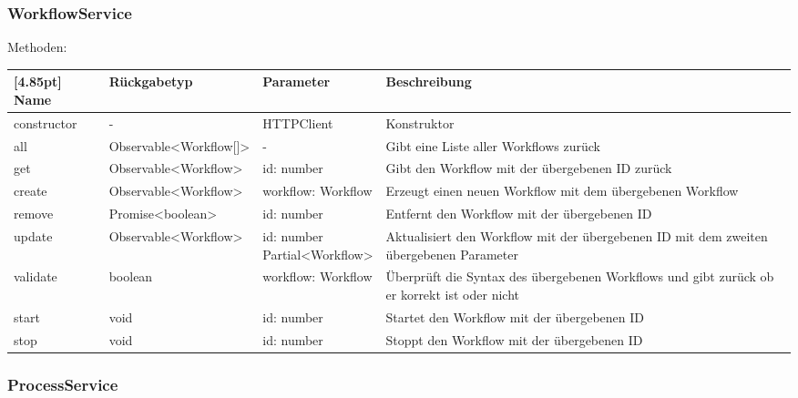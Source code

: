             \subsubsection{WorkflowService}
                
                Methoden:
        		\begin{center}
                \setlength\tabcolsep{5pt}
                	\renewcommand{\arraystretch}{1.5}
                    	\begin{tabularx}{\textwidth}{|l|l|l|X|}
                    	\hline
                    	\rowcolor[gray]{0.75}[4.85pt]
                		Name & Rückgabetyp & Parameter & Beschreibung \\ \hline 
                        constructor & - & HTTPClient & Konstruktor \\ \hline
                        all & Observable<Workflow[]> & - & Gibt eine Liste aller Workflows zurück\\ \hline
                        get & Observable<Workflow> & id: number & Gibt den Workflow mit der übergebenen ID zurück \\ \hline
                        create & Observable<Workflow> & workflow: Workflow & Erzeugt einen neuen Workflow mit dem übergebenen Workflow \\ \hline
                        remove & Promise<boolean> & id: number & Entfernt den Workflow mit der übergebenen ID \\ \hline
                        update & Observable<Workflow> & \thead{id: number\\Partial<Workflow>} & Aktualisiert den Workflow mit der übergebenen ID mit dem zweiten übergebenen Parameter \\ \hline
                        validate & boolean & workflow: Workflow & Überprüft die Syntax des übergebenen Workflows und gibt zurück ob er korrekt ist oder nicht \\ \hline
                        start & void & id: number & Startet den Workflow mit der übergebenen ID \\ \hline
                        stop & void & id: number & Stoppt den Workflow mit der übergebenen ID \\ \hline
                        \end{tabularx}
        		\end{center}
            
            \subsubsection{ProcessService}
            
